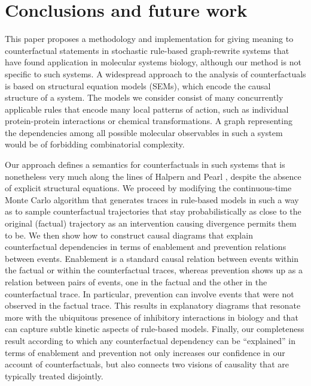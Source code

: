 
\section*{Conclusions and future work}

This paper proposes a methodology and implementation for giving
meaning to counterfactual statements in stochastic rule-based
graph-rewrite systems that have found application in molecular systems
biology, although our method is not specific to such systems. A
widespread approach to the analysis of counterfactuals is based on
structural equation models (SEMs), which encode the causal structure
of a system. The models we consider consist of many concurrently
applicable rules that encode many local patterns of action, such as
individual protein-protein interactions or chemical transformations. A
graph representing the dependencies among all possible molecular
observables in such a system would be of forbidding combinatorial
complexity.

Our approach defines a semantics for counterfactuals in such systems
that is nonetheless very much along the lines of Halpern and Pearl
\cite{pearl2009causality,halpern2016actual}, despite the absence of
explicit structural equations. We proceed by modifying the
continuous-time Monte Carlo algorithm that generates traces in
rule-based models in such a way as to sample counterfactual
trajectories that stay probabilistically as close to the original
(factual) trajectory as an intervention causing divergence permits
them to be. We then show how to construct causal diagrams that explain
counterfactual dependencies in terms of enablement and prevention
relations between events. Enablement is a standard causal relation
between events within the factual or within the counterfactual traces,
whereas prevention shows up as a relation between pairs of events, one
in the factual and the other in the counterfactual trace. In
particular, prevention can involve events that were not observed in
the factual trace. This results in explanatory diagrams that resonate
more with the ubiquitous presence of inhibitory interactions in
biology and that can capture subtle kinetic aspects of rule-based
models.  Finally, our completeness result according to which any
counterfactual dependency can be ``explained'' in terms of enablement
and prevention not only increases our confidence in our account of
counterfactuals, but also connects two visions of causality that are
typically treated disjointly.


